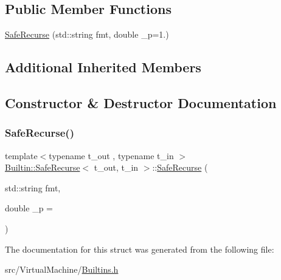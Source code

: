 \subsection*{Public Member Functions}
\begin{DoxyCompactItemize}
\item 
\hyperlink{struct_builtin_1_1_safe_recurse_a08d0badfed57f035599c184302f89304}{Safe\+Recurse} (std\+::string fmt, double \+\_\+p=1.)
\end{DoxyCompactItemize}
\subsection*{Additional Inherited Members}


\subsection{Constructor \& Destructor Documentation}
\mbox{\label{struct_builtin_1_1_safe_recurse_a08d0badfed57f035599c184302f89304}} 
\subsubsection{\texorpdfstring{Safe\+Recurse()}{SafeRecurse()}}
{\footnotesize\ttfamily template$<$typename t\+\_\+out , typename t\+\_\+in $>$ \\
\hyperlink{struct_builtin_1_1_safe_recurse}{Builtin\+::\+Safe\+Recurse}$<$ t\+\_\+out, t\+\_\+in $>$\+::\hyperlink{struct_builtin_1_1_safe_recurse}{Safe\+Recurse} (\begin{DoxyParamCaption}\item[{std\+::string}]{fmt,  }\item[{double}]{\+\_\+p = {} }\end{DoxyParamCaption})\hspace{0.3cm}{\ttfamily [inline]}}



The documentation for this struct was generated from the following file\+:\begin{DoxyCompactItemize}
\item 
src/\+Virtual\+Machine/\hyperlink{_builtins_8h}{Builtins.\+h}\end{DoxyCompactItemize}
